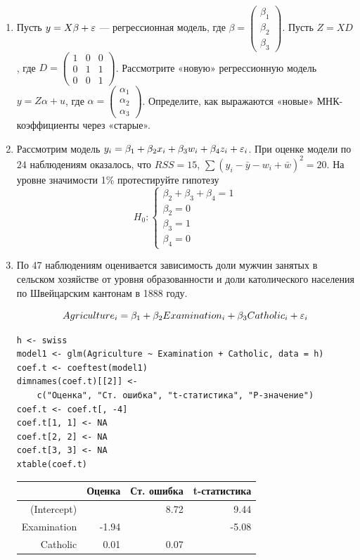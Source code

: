 \documentclass[12pt, a4paper]{article}
\begin{document}
\begin{enumerate}
\item Пусть $y = X\beta + \varepsilon$ — регрессионная модель, где $\beta = \begin{pmatrix} \beta_1 \\ \beta_2 \\ \beta_3 \end{pmatrix}$. Пусть $Z = XD$, где $D = \begin{pmatrix} 1 & 0 & 0 \\ 0 & 1 & 1 \\ 0 & 0 & 1 \end{pmatrix}$. Рассмотрите «новую» регрессионную модель $y = Z\alpha + u$, где $\alpha = \begin{pmatrix} \alpha_1 \\ \alpha_2 \\ \alpha_3 \end{pmatrix}$. Определите, как выражаются «новые» МНК-коэффициенты через «старые».
\item  Рассмотрим модель $y_i = \beta_1+ \beta_2 x_i + \beta_3 w_i +\beta_4 z_i + \varepsilon_i$.  При оценке модели по $24$ наблюдениям оказалось, что $RSS=15$, $\sum (y_i-\bar{y}-w_i+\bar{w})^2=20$. На уровне значимости 1\% протестируйте гипотезу
\[
H_0:
\begin{cases}
\beta_2+\beta_3+\beta_4=1 \\
\beta_2=0 \\
\beta_3=1 \\
\beta_4=0
\end{cases}
\]
\item  По 47 наблюдениям оценивается зависимость доли мужчин занятых в сельском хозяйстве от уровня образованности и доли католического населения по Швейцарским кантонам в 1888 году.

\[Agriculture_i=\beta_1+\beta_2 Examination_i+\beta_3 Catholic_i+\varepsilon_i\]

\begin{verbatim}
h <- swiss
model1 <- glm(Agriculture ~ Examination + Catholic, data = h)
coef.t <- coeftest(model1)
dimnames(coef.t)[[2]] <-
    c("Оценка", "Ст. ошибка", "t-статистика", "P-значение")
coef.t <- coef.t[, -4]
coef.t[1, 1] <- NA
coef.t[2, 2] <- NA
coef.t[3, 3] <- NA
xtable(coef.t)
\end{verbatim}


\begin{table}[ht]
\centering
\begin{tabular}{rrrr}
  \hline
 & Оценка & Ст. ошибка & t-статистика \\
  \hline
(Intercept) &  & 8.72 & 9.44 \\
  Examination & -1.94 &  & -5.08 \\
  Catholic & 0.01 & 0.07 &  \\
   \hline
\end{tabular}
\end{table}



\end{enumerate}
\end{document}
